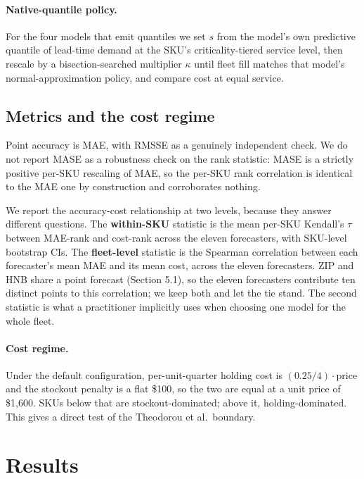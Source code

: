 \documentclass[11pt]{article}
\begin{document}
\paragraph{Native-quantile policy.} For the four models that emit quantiles we
set $s$ from the model's own predictive quantile of lead-time demand at the
SKU's criticality-tiered service level, then rescale by a bisection-searched
multiplier $\kappa$ until fleet fill matches that model's normal-approximation
policy, and compare cost at equal service.

\subsection{Metrics and the cost regime}

Point accuracy is MAE, with RMSSE as a genuinely independent check. We do not
report MASE as a robustness check on the rank statistic: MASE is a strictly
positive per-SKU rescaling of MAE, so the per-SKU rank correlation is identical
to the MAE one by construction and corroborates nothing.

We report the accuracy-cost relationship at two levels, because they answer
different questions. The \textbf{within-SKU} statistic is the mean per-SKU
Kendall's $\tau$ between MAE-rank and cost-rank across the eleven forecasters,
with SKU-level bootstrap CIs. The \textbf{fleet-level} statistic is the
Spearman correlation between each forecaster's mean MAE and its mean cost,
across the eleven forecasters. ZIP and HNB share a point forecast (Section
5.1), so the eleven forecasters contribute ten distinct points to this
correlation; we keep both and let the tie stand. The second statistic is what
a practitioner implicitly uses when choosing one model for the whole fleet.

\paragraph{Cost regime.} Under the default configuration, per-unit-quarter
holding cost is $(0.25/4)\cdot\text{price}$ and the stockout penalty is a flat
\$100, so the two are equal at a unit price of \$1{,}600. SKUs below that are
stockout-dominated; above it, holding-dominated. This gives a direct test of
the Theodorou et al.\ boundary.

\section{Results}
\end{document}
